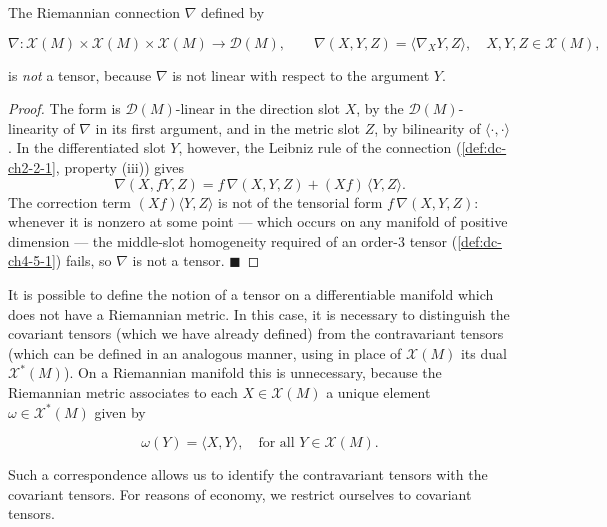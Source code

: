 \begin{example}
  \label{ex:dc-ch4-5-4}
  \leanok
  The Riemannian connection $\nabla$ defined by

  $$
  \nabla:\mathcal{X}(M)\times\mathcal{X}(M)\times\mathcal{X}(M)\to\mathcal{D}(M),\qquad\nabla(X,Y,Z)=\langle\nabla_X Y,Z\rangle,\quad X,Y,Z\in\mathcal{X}(M),
  $$

  is \emph{not} a tensor, because $\nabla$ is not linear with respect to the argument
  $Y$.
\end{example}
\begin{proof}
  \leanok
  The form is $\mathcal{D}(M)$-linear in the direction slot $X$, by the
  $\mathcal{D}(M)$-linearity of $\nabla$ in its first argument, and in the metric
  slot $Z$, by bilinearity of $\langle\cdot,\cdot\rangle$. In the differentiated
  slot $Y$, however, the Leibniz rule of the connection (\cref{def:dc-ch2-2-1},
  property (iii)) gives
  $$
  \nabla(X, fY, Z)=f\,\nabla(X, Y, Z)+(Xf)\,\langle Y, Z\rangle .
  $$
  The correction term $(Xf)\langle Y,Z\rangle$ is not of the tensorial form
  $f\,\nabla(X,Y,Z)$: whenever it is nonzero at some point — which occurs on any
  manifold of positive dimension — the middle-slot homogeneity required of an
  order-$3$ tensor (\cref{def:dc-ch4-5-1}) fails, so $\nabla$ is not a tensor.
  $\blacksquare$
\end{proof}

\begin{remark}[Remark 5.5]
  \label{rem:dc-ch4-5-5}
  It is possible to define the notion of a tensor on a differentiable manifold which
  does not have a Riemannian metric. In this case, it is necessary to distinguish
  the covariant tensors (which we have already defined) from the contravariant
  tensors (which can be defined in an analogous manner, using in place of
  $\mathcal{X}(M)$ its dual $\mathcal{X}^*(M)$). On a Riemannian manifold this is
  unnecessary, because the Riemannian metric associates to each $X\in\mathcal{X}(M)$
  a unique element $\omega\in\mathcal{X}^*(M)$ given by
  
  $$
  \omega(Y)=\langle X,Y\rangle,\quad\text{for all }Y\in\mathcal{X}(M).
  $$
  
  Such a correspondence allows us to identify the contravariant tensors with the
  covariant tensors. For reasons of economy, we restrict ourselves to covariant
  tensors.
\end{remark}

